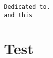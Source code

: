 \documentclass[a5paper,11pt]{book}
\begin{document}



\setcounter{page}{1}
\tt Dedicated to.
\\ and this

\frontmatter


\mainmatter
\chapter{Test}

\backmatter
\end{document}

